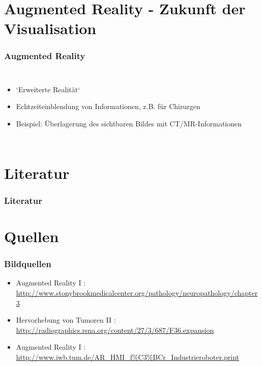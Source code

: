 \documentclass[14pt]{beamer}
\begin{document}
\section{Augmented Reality - Zukunft der Visualisation}
\begin{frame}
\frametitle{Augmented Reality}
\begin{columns}
	    \begin{itemize}
	    \item `Erweiterte Realität`
	    \item Echtzeiteinblendung von Informationen, z.B. für Chirurgen
	    \item Beispiel: Überlagerung des sichtbaren Bildes mit CT/MR-Informationen
	    \end{itemize}
\end{columns}
\end{frame}
%
%
%
\section{Literatur}
\begin{frame}
\frametitle{Literatur}
\cite{Azuma1997}
\end{frame}
%
%
%
\section{Quellen}
\begin{frame}[shrink]
 \frametitle{Bildquellen}
 \begin{itemize}
  \item Augmented Reality I :\\ \url{http://www.stonybrookmedicalcenter.org/pathology/neuropathology/chapter3}
  \item Hervorhebung von Tumoren II :\\ \url{http://radiographics.rsna.org/content/27/3/687/F36.expansion}
  \item Augmented Reality I :\\ \url{http://www.iwb.tum.de/AR_HMI_f\%C3\%BCr_Industrieroboter.print}
 \end{itemize}

\end{frame}
\end{document}
